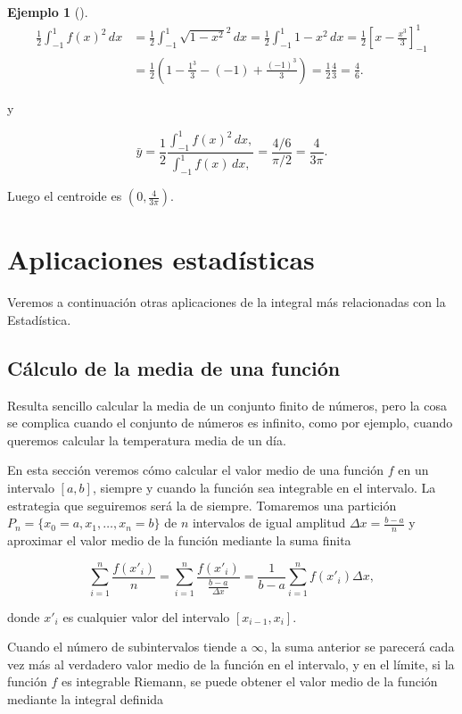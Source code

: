 \documentclass[
  a4paper,
]{scrreport}
\theoremstyle{plain}
\theoremstyle{definition}
\theoremstyle{plain}
\theoremstyle{plain}
\theoremstyle{definition}
\newtheorem{example}{Ejemplo}[chapter]
\theoremstyle{definition}
\theoremstyle{remark}
\begin{document}
\begin{example}[]
\begin{align*}
\frac{1}{2}\int_{-1}^1 f(x)^2\,dx 
&= \frac{1}{2}\int_{-1}^1 \sqrt{1-x^2}^2\,dx 
= \frac{1}{2}\int_{-1}^1 1-x^2\,dx
= \frac{1}{2}\left[x - \frac{x^3}{3}\right]_{-1}^1 \\
&= \frac{1}{2}\left(1-\frac{1^3}{3}-(-1)+\frac{(-1)^3}{3}\right)
= \frac{1}{2}\frac{4}{3}
= \frac{4}{6}. 
\end{align*}

y

\[
\bar y = \frac{1}{2}\frac{\int_{-1}^1 f(x)^2\, dx,}{\int_{-1}^1 f(x)\, dx,} = \frac{4/6}{\pi/2} = \frac{4}{3\pi}.
\]

Luego el centroide es \(\left(0, \frac{4}{3\pi}\right)\).

\end{example}

\section{Aplicaciones estadísticas}\label{aplicaciones-estaduxedsticas}

Veremos a continuación otras aplicaciones de la integral más
relacionadas con la Estadística.

\subsection{Cálculo de la media de una
función}\label{sec-valor-medio-integral}

Resulta sencillo calcular la media de un conjunto finito de números,
pero la cosa se complica cuando el conjunto de números es infinito, como
por ejemplo, cuando queremos calcular la temperatura media de un día.

En esta sección veremos cómo calcular el valor medio de una función
\(f\) en un intervalo \([a,b]\), siempre y cuando la función sea
integrable en el intervalo. La estrategia que seguiremos será la de
siempre. Tomaremos una partición \(P_n=\{x_0=a, x_1, \ldots, x_n=b\}\)
de \(n\) intervalos de igual amplitud \(\Delta x = \frac{b-a}{n}\) y
aproximar el valor medio de la función mediante la suma finita

\[
\sum_{i=1}^n \frac{f(x'_i)}{n} = \sum_{i=1}^n \frac{f(x'_i)}{\frac{b-a}{\Delta x}} = \frac{1}{b-a}\sum_{i=1}^n f(x'_i)\Delta x,
\]

donde \(x'_i\) es cualquier valor del intervalo \([x_{i-1},x_i]\).

Cuando el número de subintervalos tiende a \(\infty\), la suma anterior
se parecerá cada vez más al verdadero valor medio de la función en el
intervalo, y en el límite, si la función \(f\) es integrable Riemann, se
puede obtener el valor medio de la función mediante la integral definida
\end{document}
